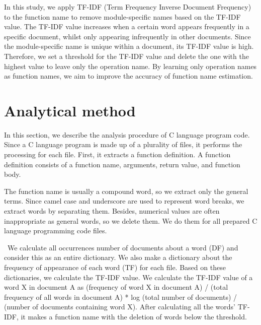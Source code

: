 \documentclass[JIP]{apris}
\begin{document}
In this study, we apply TF-IDF (Term Frequency Inverse Document Frequency)\cite{ramos2003using} to the function name to remove module-specific names based on the TF-IDF value. The TF-IDF value increases when a certain word appears frequently in a specific document, whilst only appearing infrequently in other documents. Since the module-specific name is unique within a document, its TF-IDF value is high. Therefore, we set a threshold for the TF-IDF value and delete the one with the highest value to leave only the operation name. By learning only operation names as function names, we aim to improve the accuracy of function name estimation. 

\section{Analytical method}
In this section, we describe the analysis procedure of C language program code.
Since a C language program is made up of a plurality of files, it performs the processing for each file. First, it extracts a function definition. A function definition consists of a function name, arguments, return value, and function body.

The function name is usually a compound word, so we extract only the general terms. Since camel case and underscore are used to represent word breaks, we extract words by separating them.
Besides, numerical values ​​are often inappropriate as general words, so we delete them. We do them for all prepared C language programming code files.

 We calculate all occurrences number of documents about a word (DF) and consider this as an entire dictionary. We also make a dictionary about the frequency of appearance of each word (TF) for each file. Based on these dictionaries, we calculate the TF-IDF value.
We calculate the TF-IDF value of a word X in document A as (frequency of word X in document A) / (total frequency of all words in document A) * log (total number of documents) / (number of documents containing word X).
After calculating all the words' TF-IDF, it makes a function name with the deletion of words below the threshold.
\end{document}
